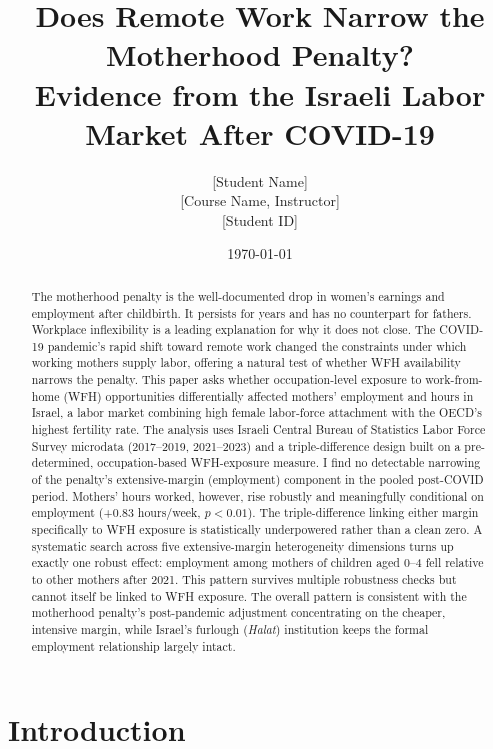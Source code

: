 \documentclass[11pt]{article}
\title{Does Remote Work Narrow the Motherhood Penalty?\\
Evidence from the Israeli Labor Market After COVID-19}
\author{[Student Name] \\{} [Course Name, Instructor] \\{} [Student ID]}
\date{\today}
\begin{document}
\maketitle

\begin{abstract}
\noindent The motherhood penalty is the well-documented drop in women's earnings and employment after childbirth. It persists for years and has no counterpart for fathers. Workplace inflexibility is a leading explanation for why it does not close. The COVID-19 pandemic's rapid shift toward remote work changed the constraints under which working mothers supply labor, offering a natural test of whether WFH availability narrows the penalty. This paper asks whether occupation-level exposure to work-from-home (WFH) opportunities differentially affected mothers' employment and hours in Israel, a labor market combining high female labor-force attachment with the OECD's highest fertility rate. The analysis uses Israeli Central Bureau of Statistics Labor Force Survey microdata (2017--2019, 2021--2023) and a triple-difference design built on a pre-determined, occupation-based WFH-exposure measure. I find no detectable narrowing of the penalty's extensive-margin (employment) component in the pooled post-COVID period. Mothers' hours worked, however, rise robustly and meaningfully conditional on employment (+0.83 hours/week, $p<0.01$). The triple-difference linking either margin specifically to WFH exposure is statistically underpowered rather than a clean zero. A systematic search across five extensive-margin heterogeneity dimensions turns up exactly one robust effect: employment among mothers of children aged 0--4 fell relative to other mothers after 2021. This pattern survives multiple robustness checks but cannot itself be linked to WFH exposure. The overall pattern is consistent with the motherhood penalty's post-pandemic adjustment concentrating on the cheaper, intensive margin, while Israel's furlough (\textit{Halat}) institution keeps the formal employment relationship largely intact.
\end{abstract}

\section{Introduction}
\end{document}
